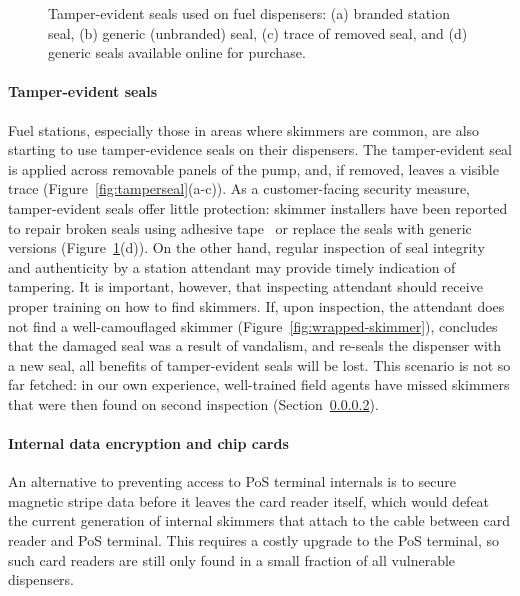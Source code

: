\begin{figure}
    \begin{minipage}{\linewidth}
    \end{minipage}
    \caption{Tamper-evident seals used on fuel dispensers: (a) branded station seal, (b) generic (unbranded) seal, (c) trace of removed seal, and (d) generic seals available online for purchase.}
    \label{fig:seals}
\end{figure}

\paragraph{Tamper-evident seals} Fuel stations, especially those in areas where skimmers are common, are also starting to use tamper-evidence seals on their dispensers. The tamper-evident seal is applied across removable panels of the pump, and, if removed, leaves a visible trace (Figure~\ref{fig:tamperseal}(a-c)). As a customer-facing security measure, tamper-evident seals offer little protection: skimmer installers have been reported to repair broken seals using adhesive tape~\cite{} or replace the seals with generic versions (Figure~\ref{fig:seals}(d)).  On the other hand, regular inspection of seal integrity and authenticity by a station attendant may provide timely indication of tampering. It is important, however, that inspecting attendant should receive proper training on how to find skimmers. If, upon inspection, the attendant does not find a well-camouflaged skimmer (Figure~\ref{fig:wrapped-skimmer}), concludes that the damaged seal was a result of vandalism, and re-seals the dispenser with a new seal, all benefits of tamper-evident seals will be lost. This scenario is not so far fetched: in our own experience, well-trained field agents have missed skimmers that were then found on second inspection (Section~\ref{}). 

\paragraph{Internal data encryption and chip cards} An alternative to preventing access to PoS terminal internals is to secure magnetic stripe data before it leaves the card reader itself, which would defeat the current generation of internal skimmers that attach to the cable between card reader and PoS terminal. This requires a costly upgrade to the PoS terminal, so such card readers are still only found in a small fraction of all vulnerable dispensers.

